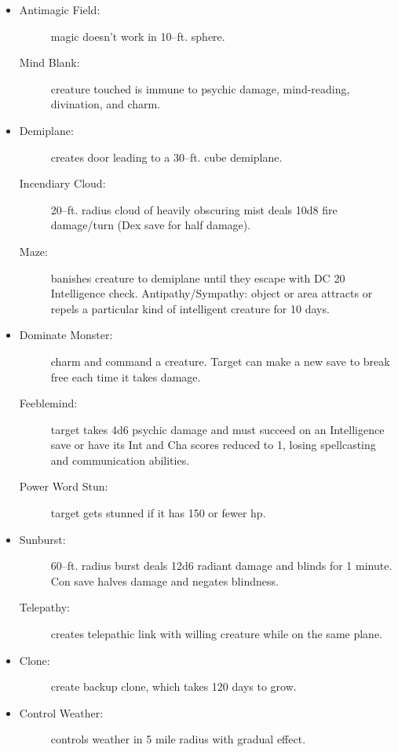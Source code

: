 \documentclass[DIV=14, paper=a4, fontsize=12pt, twocolumn, twoside]{scrartcl}
\begin{document}
\begin{itemize}[align=parleft,labelwidth=1cm]
	\renewcommand{\labelitemi}{Abjur}\item
	\begin{description}
 \item[Antimagic Field:] magic doesn’t work in 10–ft. sphere.
 \item[Mind Blank:] creature touched is immune to psychic damage, mind-reading, divination, and charm.
\end{description}
\renewcommand{\labelitemi}{Conj}\item
\begin{description}
 \item[Demiplane:] creates door leading to a 30–ft. cube demiplane.
 \item[Incendiary Cloud:] 20–ft. radius cloud of heavily obscuring mist deals 10d8 fire damage/turn (Dex save for half damage).
 \item[Maze:] banishes creature to demiplane until they escape with DC 20 Intelligence check. Antipathy/Sympathy: object or area attracts or repels a particular kind of intelligent creature for 10 days.
\end{description}
\renewcommand{\labelitemi}{Ench}\item
\begin{description}
 \item[Dominate Monster:] charm and command a creature. Target can make a new save to break free each time it takes damage.
 \item[Feeblemind:] target takes 4d6 psychic damage and must succeed on an Intelligence save or have its Int and Cha scores reduced to 1, losing spellcasting and communication abilities.
 \item[Power Word Stun:] target gets stunned if it has 150 or fewer hp.
\end{description}
\renewcommand{\labelitemi}{Evoc}\item
\begin{description}
 \item[Sunburst:] 60–ft. radius burst deals 12d6 radiant damage and blinds for 1 minute. Con save halves damage and negates blindness.
 \item[Telepathy:] creates telepathic link with willing creature while on the same plane.
\end{description}
\renewcommand{\labelitemi}{Necro}\item
\begin{description}
 \item[Clone:] create backup clone, which takes 120 days to grow.
\end{description}
\renewcommand{\labelitemi}{Trans}\item
\begin{description}
 \item[Control Weather:] controls weather in 5 mile radius with gradual effect.
\end{description}
\end{itemize}
\end{document}
